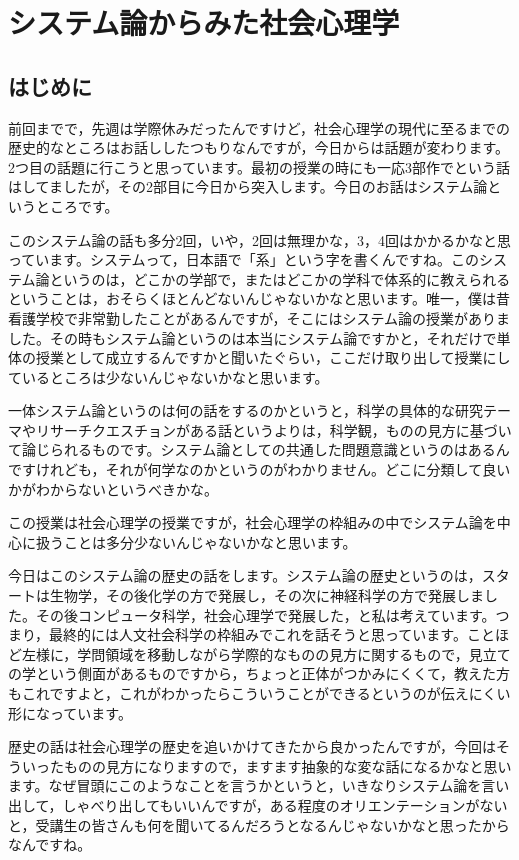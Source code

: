 \documentclass{ltjsbook}
\begin{document}
\setcounter{chapter}{7}
\chapter{システム論からみた社会心理学}
\label{sp08_system}

\section{はじめに}
前回までで，先週は学際休みだったんですけど，社会心理学の現代に至るまでの歴史的なところはお話ししたつもりなんですが，今日からは話題が変わります。2つ目の話題に行こうと思っています。最初の授業の時にも一応3部作でという話はしてましたが，その2部目に今日から突入します。今日のお話はシステム論というところです。

このシステム論の話も多分2回，いや，2回は無理かな，3，4回はかかるかなと思っています。システムって，日本語で「系」という字を書くんですね。このシステム論というのは，どこかの学部で，またはどこかの学科で体系的に教えられるということは，おそらくほとんどないんじゃないかなと思います。唯一，僕は昔看護学校で非常勤したことがあるんですが，そこにはシステム論の授業がありました。その時もシステム論というのは本当にシステム論ですかと，それだけで単体の授業として成立するんですかと聞いたぐらい，ここだけ取り出して授業にしているところは少ないんじゃないかなと思います。

一体システム論というのは何の話をするのかというと，科学の具体的な研究テーマやリサーチクエスチョンがある話というよりは，科学観，ものの見方に基づいて論じられるものです。システム論としての共通した問題意識というのはあるんですけれども，それが何学なのかというのがわかりません。どこに分類して良いかがわからないというべきかな。

この授業は社会心理学の授業ですが，社会心理学の枠組みの中でシステム論を中心に扱うことは多分少ないんじゃないかなと思います。

今日はこのシステム論の歴史の話をします。システム論の歴史というのは，スタートは生物学，その後化学の方で発展し，その次に神経科学の方で発展しました。その後コンピュータ科学，社会心理学で発展した，と私は考えています。つまり，最終的には人文社会科学の枠組みでこれを話そうと思っています。ことほど左様に，学問領域を移動しながら学際的なものの見方に関するもので，見立ての学という側面があるものですから，ちょっと正体がつかみにくくて，教えた方もこれですよと，これがわかったらこういうことができるというのが伝えにくい形になっています。

歴史の話は社会心理学の歴史を追いかけてきたから良かったんですが，今回はそういったものの見方になりますので，ますます抽象的な変な話になるかなと思います。なぜ冒頭にこのようなことを言うかというと，いきなりシステム論を言い出して，しゃべり出してもいいんですが，ある程度のオリエンテーションがないと，受講生の皆さんも何を聞いてるんだろうとなるんじゃないかなと思ったからなんですね。
\end{document}
